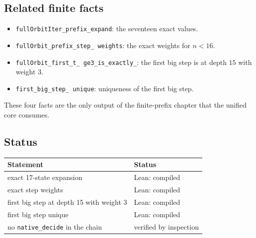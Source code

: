 \subsection{Related finite facts}

\begin{itemize}[leftmargin=*]
\item \texttt{fullOrbitIter\_\allowbreak prefix\_\allowbreak expand}:
  the seventeen exact values.
\item \texttt{fullOrbit\_\allowbreak prefix\_\allowbreak step\_\allowbreak
  weights}: the exact weights for $n<16$.
\item \texttt{fullOrbit\_\allowbreak first\_\allowbreak t\_\allowbreak
  ge3\_\allowbreak is\_\allowbreak exactly\_}: the first
  big step is at depth $15$ with weight $3$.
\item \texttt{first\_\allowbreak big\_\allowbreak step\_\allowbreak
  unique}: uniqueness of the first big step.
\end{itemize}

These four facts are the only output of the finite-prefix chapter that
the unified core consumes.

\subsection{Status}

\begin{center}
\small
\begin{tabular}{@{}ll@{}}
\toprule
Statement & Status \\
\midrule
exact 17-state expansion & Lean: compiled \\
exact step weights & Lean: compiled \\
first big step at depth 15 with weight 3 & Lean: compiled \\
first big step unique & Lean: compiled \\
no \texttt{native\_decide} in the chain & verified by inspection \\
\bottomrule
\end{tabular}
\end{center}
